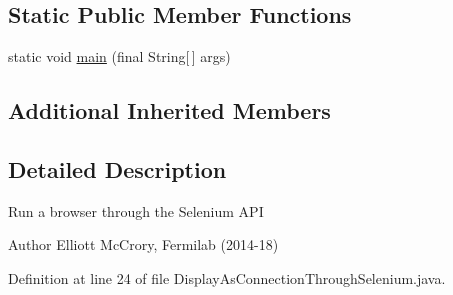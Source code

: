 \subsection*{Static Public Member Functions}
\begin{DoxyCompactItemize}
\item 
static void \hyperlink{classgov_1_1fnal_1_1ppd_1_1dd_1_1display_1_1client_1_1selenium_1_1DisplayAsConnectionThroughSelenium_a4521e424f08cb1e37b0f80fa23d75e54}{main} (final String\mbox{[}$\,$\mbox{]} args)
\end{DoxyCompactItemize}
\subsection*{Additional Inherited Members}


\subsection{Detailed Description}
Run a browser through the Selenium A\-P\-I

\begin{DoxyAuthor}{Author}
Elliott Mc\-Crory, Fermilab (2014-\/18) 
\end{DoxyAuthor}


Definition at line 24 of file Display\-As\-Connection\-Through\-Selenium.\-java.



